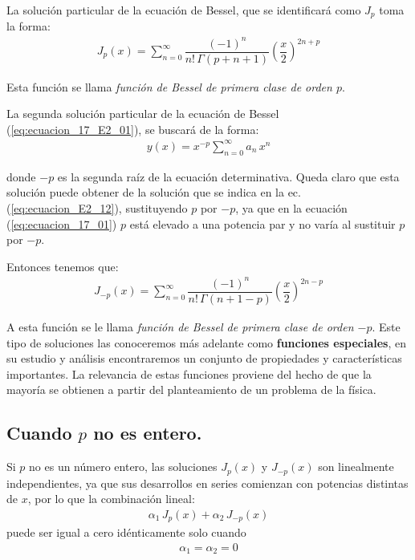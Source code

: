 La solución particular de la ecuación de Bessel, que se identificará como $J_{p}$ toma la forma:
\begin{align}
J_{p}(x) = \sum_{n=0}^{\infty} \dfrac{(-1)^{n}}{n! \, \Gamma(p + n + 1)} \left( \dfrac{x}{2} \right)^{2n+p}
\label{eq:ecuacion_E2_12}
\end{align}

Esta función se llama \emph{función de Bessel de primera clase de orden $p$}.
\par
La segunda solución particular de la ecuación de Bessel (\ref{eq:ecuacion_17_E2_01}), se buscará de la forma:
\begin{align}
y(x) = x^{-p} \sum_{n=0}^{\infty} a_{n} \, x^{n}
\label{eq:ecuacion_17_E2_13}
\end{align}

donde $-p$ es la segunda raíz de la ecuación determinativa. Queda claro que esta solución puede obtener de la solución que se indica en la ec. (\ref{eq:ecuacion_E2_12}), sustituyendo $p$ por $-p$, ya que en la ecuación (\ref{eq:ecuacion_17_01}) $p$ está elevado a una potencia par y no varía al sustituir $p$ por $-p$.
\par
Entonces tenemos que:
\begin{align}
J_{-p}(x) = \sum_{n=0}^{\infty} \dfrac{(-1)^{n}}{n! \, \Gamma(n + 1 - p)} \left( \dfrac{x}{2} \right)^{2n-p}
\label{eq:ecuacion_E2_14}
\end{align}    

A esta función se le llama \emph{función de Bessel de primera clase de orden $-p$}. Este tipo de soluciones las conoceremos más adelante como \textbf{funciones especiales}, en su estudio y análisis encontraremos un conjunto de propiedades y características importantes. La relevancia de estas funciones proviene del hecho de que la mayoría se obtienen a partir del planteamiento de un problema de la física.

\subsection{Cuando \texorpdfstring{$p$}{p} no es entero.}

Si $p$ no es un número entero, las soluciones $J_{p}(x)$ y $J_{-p}(x)$ son linealmente independientes, ya que sus desarrollos en series comienzan con potencias distintas de $x$, por lo que la combinación lineal:
\begin{align*}
\alpha_{1} \, J_{p}(x) + \alpha_{2} \, J_{-p}(x)
\end{align*}
puede ser igual a cero idénticamente solo cuando
\begin{align*}
\alpha_{1} = \alpha_{2} = 0
\end{align*}


